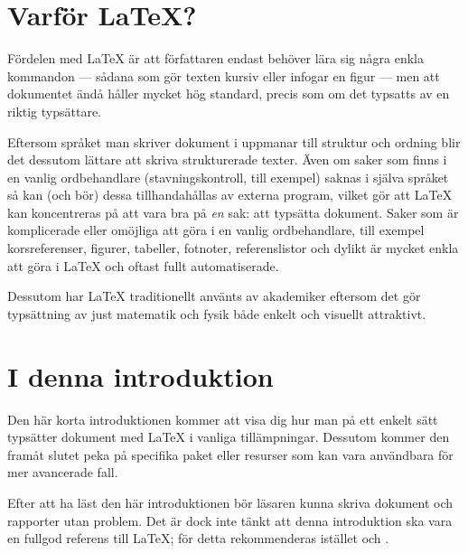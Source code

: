 \documentclass[10pt,../../a4.tex]{subfiles}
\begin{document}
\nopagebreak
{}\nopagebreak
{}\nopagebreak
\section*{Varför \LaTeX?}
Fördelen med \LaTeX{} är att författaren endast behöver lära sig några
enkla kommandon — sådana som gör texten kursiv eller infogar en figur
— men att dokumentet ändå håller mycket hög standard, precis som om
det typsatts av en riktig typsättare.

Eftersom språket man skriver dokument i uppmanar till struktur och ordning
blir det dessutom lättare att skriva strukturerade texter. Även om saker
som finns i en vanlig ordbehandlare (stavningskontroll, till exempel) saknas i
själva språket så kan (och bör) dessa tillhandahållas av externa program,
vilket gör att \LaTeX{} kan koncentreras på att vara bra på \emph{en} sak:
att typsätta dokument. Saker som är komplicerade eller omöjliga att göra
i en vanlig ordbehandlare, till exempel korsreferenser, figurer, tabeller,
fotnoter, referenslistor och dylikt är mycket enkla att göra i \LaTeX{}
och oftast fullt automatiserade.

Dessutom har \LaTeX{} traditionellt använts av akademiker eftersom det gör 
typsättning av just matematik och fysik både enkelt och visuellt attraktivt. 

\nopagebreak
{}\nopagebreak
{}\nopagebreak
\section*{I denna introduktion}
Den här korta introduktionen kommer att visa dig hur man på ett enkelt
sätt typsätter dokument med \LaTeX{} i vanliga tillämpningar.
Dessutom kommer den framåt slutet peka på specifika paket eller
resurser som kan vara användbara för mer avancerade fall.

Efter att ha läst den här introduktionen bör läsaren kunna skriva
dokument och rapporter utan problem. Det är dock inte tänkt att denna
introduktion ska vara en fullgod referens till \LaTeX; för detta
rekommenderas istället \textcite{Lamport94} och
\textcite{Mittelbach04}.
\end{document}
